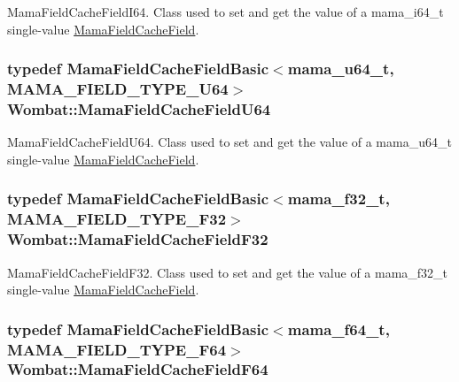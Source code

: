 MamaFieldCacheFieldI64. Class used to set and get the value of a mama\_\-i64\_\-t single-\/value {\ttfamily \hyperlink{classWombat_1_1MamaFieldCacheField}{MamaFieldCacheField}}. \hypertarget{namespaceWombat_a1f9d25b2188427d7cb1ea35d3f859317}{
\subsubsection[{MamaFieldCacheFieldU64}]{\setlength{\rightskip}{0pt plus 5cm}typedef {\bf MamaFieldCacheFieldBasic}$<$mama\_\-u64\_\-t, MAMA\_\-FIELD\_\-TYPE\_\-U64$>$ {\bf Wombat::MamaFieldCacheFieldU64}}}
\label{namespaceWombat_a1f9d25b2188427d7cb1ea35d3f859317}


MamaFieldCacheFieldU64. Class used to set and get the value of a mama\_\-u64\_\-t single-\/value {\ttfamily \hyperlink{classWombat_1_1MamaFieldCacheField}{MamaFieldCacheField}}. \hypertarget{namespaceWombat_a85192df0d07ffb481d6fbd851609779b}{
\subsubsection[{MamaFieldCacheFieldF32}]{\setlength{\rightskip}{0pt plus 5cm}typedef {\bf MamaFieldCacheFieldBasic}$<$mama\_\-f32\_\-t, MAMA\_\-FIELD\_\-TYPE\_\-F32$>$ {\bf Wombat::MamaFieldCacheFieldF32}}}
\label{namespaceWombat_a85192df0d07ffb481d6fbd851609779b}


MamaFieldCacheFieldF32. Class used to set and get the value of a mama\_\-f32\_\-t single-\/value {\ttfamily \hyperlink{classWombat_1_1MamaFieldCacheField}{MamaFieldCacheField}}. \hypertarget{namespaceWombat_a235c17651452d8c4355bfdd8f5f52aa1}{
\subsubsection[{MamaFieldCacheFieldF64}]{\setlength{\rightskip}{0pt plus 5cm}typedef {\bf MamaFieldCacheFieldBasic}$<$mama\_\-f64\_\-t, MAMA\_\-FIELD\_\-TYPE\_\-F64$>$ {\bf Wombat::MamaFieldCacheFieldF64}}}
\label{namespaceWombat_a235c17651452d8c4355bfdd8f5f52aa1}


